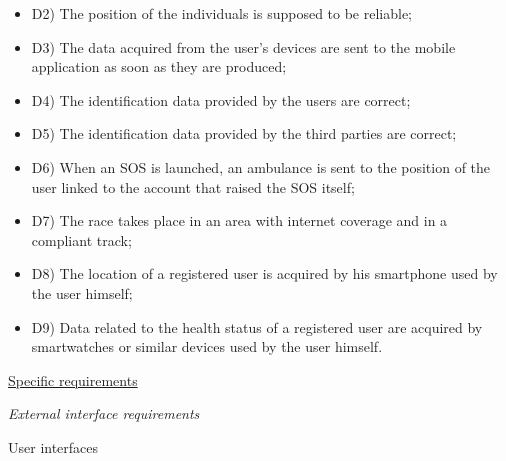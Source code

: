 \documentclass{article}
\begin{document}
\begin{legal}
\begin{legal}
\begin{legal}
{\begin{itemize}
				\item D2) The position of the individuals is supposed to be reliable;\\
				\item D3) The data acquired from the user’s devices are sent to the mobile application as soon as they are produced;\\
				\item D4) The identification data provided by the users are correct;\\
				\item D5) The identification data provided by the third parties are correct;\\
				\item D6) When an SOS is launched, an ambulance is sent to the position of the user linked to the account that raised the SOS itself;\\
				\item D7) The race takes place in an area with internet coverage and in a compliant track;\\
				\item D8) The location of a registered user is acquired by his smartphone used by the user himself;\\
				\item D9) Data related to the health status of a registered user are acquired by smartwatches or similar devices used by the user himself.\\
				\end{itemize}
			}
			\end{legal}
		\end{legal}
	
\newpage
	\item \underline{Specific requirements}
  		\begin{legal}
		\item \textit{External interface requirements}
			\begin{legal}
    		\item User interfaces \\\\
			\normalfont{
			In this section follow the main mockups that represent a basic idea of what the mobile app will look like in the first release:%

}
\end{legal}
\end{legal}
\end{legal}
\end{document}
